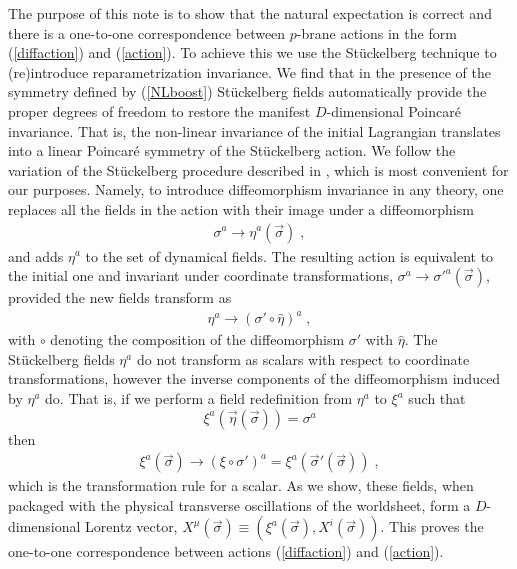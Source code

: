 \documentclass[%
 reprint,
 amsmath,amssymb,
 aps,
]{revtex4-1}
\begin{document}
The purpose of this note is to show that the natural expectation is correct and there is a one-to-one correspondence between $p$-brane actions
in the form (\ref{diffaction}) and (\ref{action}).
To achieve this we use the St\"uckelberg technique
to (re)introduce reparametrization invariance.
 We find that in the presence of the symmetry defined by (\ref{NLboost}) St\"uckelberg fields automatically provide the proper degrees of freedom to restore the
manifest $D$-dimensional Poincar\'e invariance. That is, the non-linear invariance of the initial
Lagrangian translates into a linear Poincar\'e symmetry of the St\"uckelberg action.
We follow the variation of the St\"uckelberg procedure described in
\cite{Dubovsky:2004sg}, which is most convenient for our purposes.
Namely, to introduce  diffeomorphism invariance in any theory, one
replaces all the fields in the action with their image under a diffeomorphism
\begin{eqnarray}
    \sigma^{a} \rightarrow \eta^{a}(\vec{\sigma}) \; , \nonumber
\end{eqnarray}
and adds $\eta^a$ to the set of dynamical fields. The resulting action is equivalent to the initial one and invariant under
coordinate transformations, $\sigma^a \rightarrow \sigma'^a(\vec{\sigma})$, provided the new fields transform as
\begin{eqnarray}
    \eta^{a} \rightarrow \left( \sigma' \circ \hat{\eta} \right)^{a} \; , \nonumber
\end{eqnarray}
with $\circ$ denoting the composition of the diffeomorphism $\sigma'$ with $\hat{\eta}$.
The St\"uckelberg fields $\eta^a$  do not transform as scalars with respect to coordinate transformations,
however  the inverse components of the diffeomorphism induced by $\eta^a$ do.  That is,
if we perform a field redefinition from $\eta^a$ to $\xi^{a}$ such that
\begin{equation}
\label{etadef}
\xi^{a}(\vec{\eta}(\vec{\sigma})) = \sigma^{a}
\end{equation}
 then
\begin{eqnarray}
    \xi^{a}(\vec{\sigma}) \rightarrow \left( \xi \circ \sigma' \right)^{a} = \xi^a(\vec{\sigma}'(\vec{\sigma})) \nonumber \; ,
\end{eqnarray}
which is the transformation rule for a scalar.
As we show, these fields, when packaged with the physical transverse oscillations
of the worldsheet, form a $D$-dimensional Lorentz vector,
$X^{\mu}(\vec{\sigma}) \equiv (\xi^a(\vec{\sigma}),X^i(\vec{\sigma}))$.
This proves the one-to-one correspondence between actions (\ref{diffaction}) and (\ref{action}).
\end{document}
